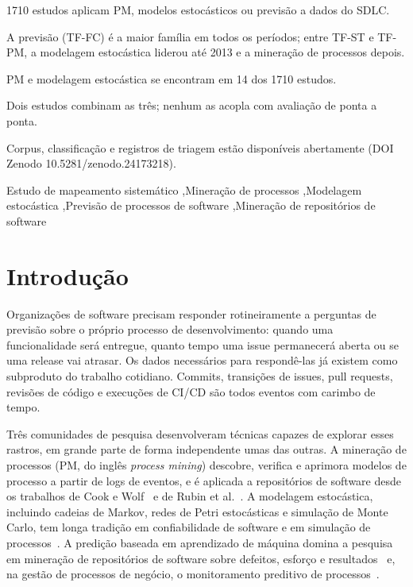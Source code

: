 \documentclass[preprint,12pt,authoryear=false]{elsarticle}
\begin{document}
\begin{frontmatter}
\begin{highlights}
\item 1710 estudos aplicam PM, modelos estocásticos ou previsão a dados do SDLC.
\item A previsão (TF-FC) é a maior família em todos os períodos; entre TF-ST e TF-PM, a modelagem estocástica liderou até 2013 e a mineração de processos depois.
\item PM e modelagem estocástica se encontram em 14 dos 1710 estudos.
\item Dois estudos combinam as três; nenhum as acopla com avaliação de ponta a ponta.
\item Corpus, classificação e registros de triagem estão disponíveis abertamente (DOI Zenodo 10.5281/zenodo.24173218).
\end{highlights}

\begin{keyword}
Estudo de mapeamento sistemático \sep Mineração de processos \sep Modelagem estocástica \sep Previsão de processos de software \sep Mineração de repositórios de software
\end{keyword}

\end{frontmatter}

\section{Introdução}\label{sec:intro}

Organizações de software precisam responder rotineiramente a perguntas de previsão sobre o próprio processo de desenvolvimento: quando uma funcionalidade será entregue, quanto tempo uma issue permanecerá aberta ou se uma release vai atrasar. Os dados necessários para respondê-las já existem como subproduto do trabalho cotidiano. Commits, transições de issues, pull requests, revisões de código e execuções de CI/CD são todos eventos com carimbo de tempo.

Três comunidades de pesquisa desenvolveram técnicas capazes de explorar esses rastros, em grande parte de forma independente umas das outras. A mineração de processos (PM, do inglês \emph{process mining}) descobre, verifica e aprimora modelos de processo a partir de logs de eventos, e é aplicada a repositórios de software desde os trabalhos de Cook e Wolf~\cite{cook1995,cook1998} e de Rubin et al.~\cite{rubin2007}. A modelagem estocástica, incluindo cadeias de Markov, redes de Petri estocásticas e simulação de Monte Carlo, tem longa tradição em confiabilidade de software e em simulação de processos~\cite{whittaker1994,ali2014}. A predição baseada em aprendizado de máquina domina a pesquisa em mineração de repositórios de software sobre defeitos, esforço e resultados~\cite{kagdi2007,hall2012} e, na gestão de processos de negócio, o monitoramento preditivo de processos~\cite{marquez2018}.
\end{document}
